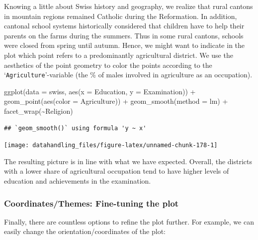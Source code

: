 \documentclass[
  12pt,
]{style/krantz}
\newenvironment{Shaded}{\begin{snugshade}}{\end{snugshade}}
\newcommand{\AttributeTok}[1]{\textcolor[rgb]{0.77,0.63,0.00}{#1}}
\newcommand{\FunctionTok}[1]{\textcolor[rgb]{0.00,0.00,0.00}{#1}}
\newcommand{\NormalTok}[1]{#1}
\newcommand{\SpecialCharTok}[1]{\textcolor[rgb]{0.00,0.00,0.00}{#1}}
\newcommand{\StringTok}[1]{\textcolor[rgb]{0.31,0.60,0.02}{#1}}
\begin{document}
Knowing a little about Swiss history and geography, we realize that rural cantons in mountain regions remained Catholic during the Reformation. In addition, cantonal school systems historically considered that children have to help their parents on the farms during the summers. Thus in some rural cantons, schools were closed from spring until autumn. Hence, we might want to indicate in the plot which point refers to a predominantly agricultural district. We use the aesthetics of the point geometry to color the points according to the `\texttt{Agriculture}'-variable (the \% of males involved in agriculture as an occupation).

\begin{Shaded}
\begin{Highlighting}[]
\FunctionTok{ggplot}\NormalTok{(}\AttributeTok{data =}\NormalTok{ swiss, }\FunctionTok{aes}\NormalTok{(}\AttributeTok{x =}\NormalTok{ Education, }\AttributeTok{y =}\NormalTok{ Examination)) }\SpecialCharTok{+}
     \FunctionTok{geom\_point}\NormalTok{(}\FunctionTok{aes}\NormalTok{(}\AttributeTok{color =}\NormalTok{ Agriculture)) }\SpecialCharTok{+}
     \FunctionTok{geom\_smooth}\NormalTok{(}\AttributeTok{method =} \StringTok{\textquotesingle{}lm\textquotesingle{}}\NormalTok{) }\SpecialCharTok{+}
     \FunctionTok{facet\_wrap}\NormalTok{(}\SpecialCharTok{\textasciitilde{}}\NormalTok{Religion)}
\end{Highlighting}
\end{Shaded}

\begin{verbatim}
## `geom_smooth()` using formula 'y ~ x'
\end{verbatim}

\texttt{[image: datahandling\_files/figure-latex/unnamed-chunk-178-1]}

The resulting picture is in line with what we have expected. Overall, the districts with a lower share of agricultural occupation tend to have higher levels of education and achievements in the examination.

\hypertarget{coordinatesthemes-fine-tuning-the-plot}{%
\subsubsection{Coordinates/Themes: Fine-tuning the plot}\label{coordinatesthemes-fine-tuning-the-plot}}

Finally, there are countless options to refine the plot further. For example, we can easily change the orientation/coordinates of the plot:
\end{document}
